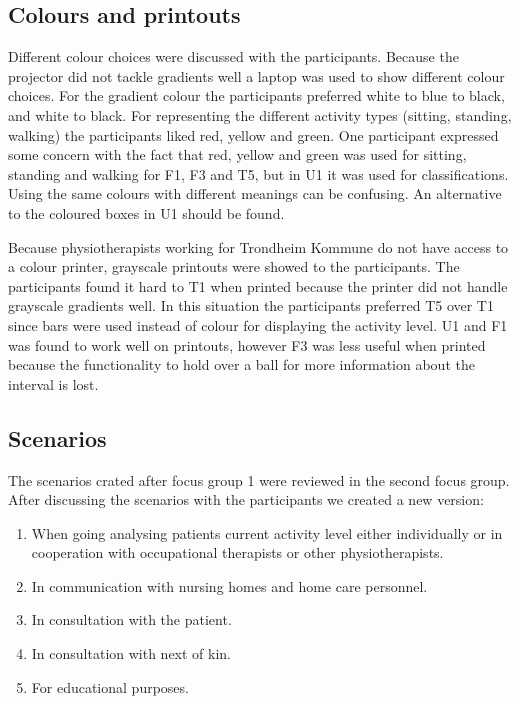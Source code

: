 \subsection{Colours and printouts}
Different colour choices were discussed with the participants. Because the projector did not tackle gradients well a laptop was used to show different colour choices. For the gradient colour the participants preferred white to blue to black, and white to black. For representing the different activity types (sitting, standing, walking) the participants liked red, yellow and green. One participant expressed some concern with the fact that red, yellow and green was used for sitting, standing and walking for F1, F3 and T5, but in U1 it was used for classifications. Using the same colours with different meanings can be confusing. An alternative to the coloured boxes in U1 should be found.

Because physiotherapists working for Trondheim Kommune do not have access to a colour printer, grayscale printouts were showed to the participants. The participants found it hard to T1 when printed because the printer did not handle grayscale gradients well. In this situation the participants preferred T5 over T1 since bars were used instead of colour for displaying the activity level. U1 and F1 was found to work well on printouts, however F3 was less useful when printed because the functionality to hold over a ball for more information about the interval is lost.

\subsection{Scenarios}
The scenarios crated after focus group 1 were reviewed in the second focus group. After discussing the scenarios with the participants we created a new version:
\vspace{-6mm}
\begin{enumerate}[itemsep=0cm, parsep=0cm]
\item When going analysing patients current activity level either individually or in cooperation with occupational therapists or other physiotherapists.
\item In communication with nursing homes and home care personnel.
\item In consultation with the patient.
\item In consultation with next of kin.
\item For educational purposes.
\end{enumerate}

